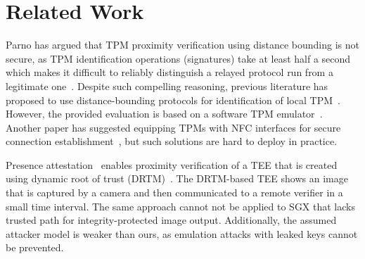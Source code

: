 
\section{Related Work}
\label{sec:relatedWork}

Parno has argued that TPM proximity verification using distance bounding is not secure, as TPM identification operations (signatures) take at least half a second which makes it difficult to reliably distinguish a relayed protocol run from a legitimate one~\cite{parno2008bootstrapping}. 
Despite such compelling reasoning, previous literature has proposed to use distance-bounding protocols for identification of local TPM~\cite{CatchingCuckoo}. However, the provided evaluation is based on a software TPM emulator~\cite{ibmTPM, trousers}. Another paper has suggested equipping TPMs with NFC interfaces for secure connection establishment~\cite{turtle}, but such solutions are hard to deploy in practice.

Presence attestation~\cite{presenceAttestation} enables proximity verification of a TEE that is created using dynamic root of trust (DRTM)~\cite{mccune2008flicker}. The DRTM-based TEE shows an image that is captured by a camera and then communicated to a remote verifier in a small time interval. 
The same approach cannot not be applied to SGX that lacks trusted path for integrity-protected image output. Additionally, the assumed attacker model is weaker than ours, as emulation attacks with leaked keys cannot be prevented.





